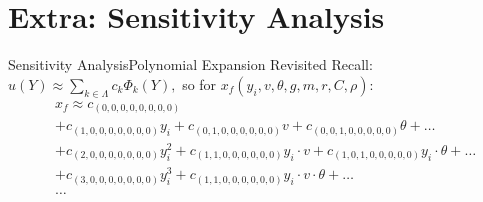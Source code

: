 \documentclass{beamer}
\newcommand{\expv}[1]{\ensuremath{\mathbb{E}[ #1]}}
\begin{document}
%

\section{Extra: Sensitivity Analysis}
\begin{frame}{Sensitivity Analysis}{Polynomial Expansion Revisited}\vspace{-30pt}
Recall: $u(Y)\approx\sum_{k\in\Lambda}c_k\Phi_k(Y),$ so for $x_f(y_i,v,\theta,g,m,r,C,\rho)$:
\begin{align*}
&x_f \approx c_{(0,0,0,0,0,0,0,0)} \\
 &+c_{(1,0,0,0,0,0,0,0)}y_i + c_{(0,1,0,0,0,0,0,0)}v + c_{(0,0,1,0,0,0,0,0)}\theta+\ldots\\
 &+c_{(2,0,0,0,0,0,0,0)}y_i^2 + c_{(1,1,0,0,0,0,0,0)}y_i\cdot v + c_{(1,0,1,0,0,0,0,0)}y_i\cdot \theta +\ldots\\
 &+c_{(3,0,0,0,0,0,0,0)}y_i^3 + c_{(1,1,0,0,0,0,0,0)}y_i\cdot v\cdot\theta +\ldots\\
 &\ldots
\end{align*}
\end{frame}
\end{document}
